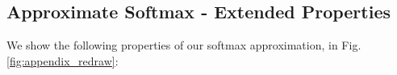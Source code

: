 \begin{comment}
\subsection{Redrawing in Softmax}
\label{subsec:redraw}
While the benefits of redrawing features was shown in Subsec. \ref{subsec:softmax_approx_transformer} of the main body of the paper, we also demonstrate its benefits when there are multiple layers with large scale (16x16 TPU-v2) training. This can be found below in Fig. \ref{fig:appendix_redraw}.


\begin{figure}[h]
  \centering
  \texttt{[image: img/progen\_B\_redraw.png]}
  \caption{The importance of redrawing features. If redrawing is not used, an "unlucky" set of random features may cause training degradation, shown by the early-stopped curve with Seed 1, while a 'lucky' set of random features may cause no issue, shown by the curve with Seed 2. Redrawing allows the training to correct itself, as seen at the black vertical line.}
  \label{fig:appendix_redraw}
\end{figure}



\subsection{Softmax Unidirectional}
\label{subsec:softmax_unidirectional}
While we have shown on TrEMBL that Performer with generalized ReLU attention outperforms softmax, we also show that approximate softmax attention can still be a solid choice, for example on ImageNet64 (U), in Fig. \ref{fig:im64_relu_softmax}.

\begin{figure}[h]
  \centering
  \texttt{[image: img/im64\_relu\_softmax.png]}
  \caption{Using the same 8x8 TPU-v2 compute and same 6-layer standard model, approximate softmax with positive features achieves the same result as generalized ReLU attention.}
  \label{fig:im64_relu_softmax}
\end{figure}

\end{comment}
\subsection{Approximate Softmax - Extended Properties}
\label{subsec:redraw}
\label{subsec:softmax_unidirectional}
\label{subsec:unstable_trig}
We show the following properties of our softmax approximation, in Fig. \ref{fig:appendix_redraw}:

